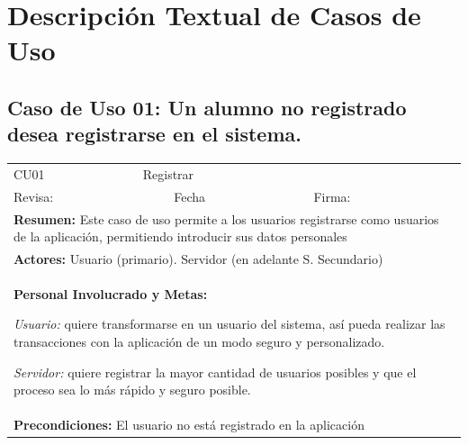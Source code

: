 \section{Descripción Textual de Casos de Uso}


\subsection{Caso de Uso 01: Un alumno no registrado desea registrarse en el sistema.}

\begin{longtable}{|l|p{5.5cm}|l|p{2cm}|l|p{1.9cm}|} \hline
    \cellcolor{grisOscuro} CU01 & \multicolumn{4}{|l|}{  \cellcolor{grisOscuro} Registrar} &  \cellcolor{grisClaro}\multirow{2}{1cm}{} \\ \cline{1-5}
    \cellcolor{grisOscuro} Revisa: &  \cellcolor{grisClaro} &  \cellcolor{grisOscuro} Fecha &  \cellcolor{grisClaro} &  \cellcolor{grisOscuro} Firma: & \cellcolor{grisClaro} \\ \hline
    \multicolumn{6}{|p{15cm}|}{ \textbf{Resumen: } Este caso de uso permite a los usuarios registrarse como usuarios de la aplicación, permitiendo introducir sus datos personales

    } \\ \hline

    \multicolumn{6}{|p{15cm}|}{ \textbf{Actores: } Usuario (primario). Servidor (en adelante S. Secundario)

    } \\ \hline

    \multicolumn{6}{|p{15cm}|}{ \textbf{Personal Involucrado y Metas: }
    
    \emph{Usuario:} quiere transformarse en un usuario del sistema, así pueda realizar las transacciones con la aplicación de un modo seguro y personalizado.
    
    \emph{Servidor: } quiere registrar la mayor cantidad de usuarios posibles y que el proceso sea lo más rápido y seguro posible.
    } \\ \hline

    \multicolumn{6}{|p{15cm}|}{ \textbf{Precondiciones: } El usuario no está registrado en la aplicación

    } \\ \hline


\end{longtable}
